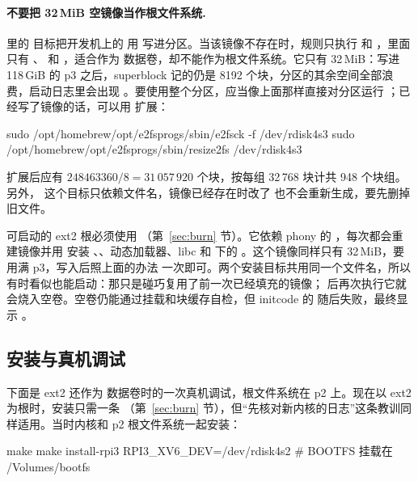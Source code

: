 \paragraph{不要把 32\,MiB 空镜像当作根文件系统.}  里的  目标把开发机上的  用  写进分区。当该镜像不存在时，规则只执行  和 ，里面只有 、 和 ，适合作为  数据卷，却不能作为根文件系统。它只有 32\,MiB：写进 118\,GiB 的 p3 之后，superblock 记的仍是 8192 个块，分区的其余空间全部浪费，启动日志里会出现 。要使用整个分区，应当像上面那样直接对分区运行 ；已经写了镜像的话，可以用  扩展：

\begin{shcode}
sudo /opt/homebrew/opt/e2fsprogs/sbin/e2fsck -f /dev/rdisk4s3
sudo /opt/homebrew/opt/e2fsprogs/sbin/resize2fs /dev/rdisk4s3
\end{shcode}

扩展后应有 $248463360 / 8 = 31\,057\,920$ 个块，按每组 32\,768 块计共 948 个块组。另外， 这个目标只依赖文件名，镜像已经存在时改了  也不会重新生成，要先删掉旧文件。

可启动的 ext2 根必须使用 （第~\ref{sec:burn} 节）。它依赖 phony 的 ，每次都会重建镜像并用  安装 、、动态加载器、libc 和  下的 。这个镜像同样只有 32\,MiB，要用满 p3，写入后照上面的办法  一次即可。两个安装目标共用同一个文件名，所以  有时看似也能启动：那只是碰巧复用了前一次已经填充的镜像； 后再次执行它就会烧入空卷。空卷仍能通过挂载和块缓存自检，但 initcode 的  随后失败，最终显示 。

\subsection{安装与真机调试}
\label{sec:ext2-install}

下面是 ext2 还作为  数据卷时的一次真机调试，根文件系统在 p2 上。现在以 ext2 为根时，安装只需一条 （第~\ref{sec:burn} 节），但“先核对新内核的日志”这条教训同样适用。当时内核和 p2 根文件系统一起安装：

\begin{shcode}
make
make install-rpi3 RPI3_XV6_DEV=/dev/rdisk4s2   # BOOTFS 挂载在 /Volumes/bootfs
\end{shcode}

